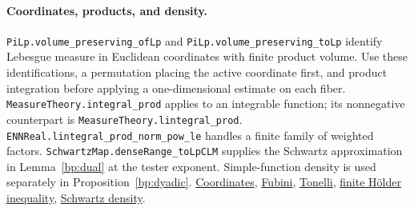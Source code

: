 \documentclass[11pt,letterpaper]{article}
\theoremstyle{definition}
\begin{document}
\paragraph{Coordinates, products, and density.}
\nolinkurl{PiLp.volume_preserving_ofLp} and \nolinkurl{PiLp.volume_preserving_toLp} identify Lebesgue measure in Euclidean coordinates with finite product volume. Use these identifications, a permutation placing the active coordinate first, and product integration before applying a one-dimensional estimate on each fiber. \nolinkurl{MeasureTheory.integral_prod} applies to an integrable function; its nonnegative counterpart is \nolinkurl{MeasureTheory.lintegral_prod}. \nolinkurl{ENNReal.lintegral_prod_norm_pow_le} handles a finite family of weighted factors. \nolinkurl{SchwartzMap.denseRange_toLpCLM} supplies the Schwartz approximation in Lemma~\ref{bp:dual} at the tester exponent. Simple-function density is used separately in Proposition~\ref{bp:dyadic}. \href{https://github.com/leanprover-community/mathlib4/blob/c55e6e786f49471c72fbddbec5415808896aec1e/Mathlib/MeasureTheory/Measure/Haar/InnerProductSpace.lean#L134}{Coordinates}, \href{https://github.com/leanprover-community/mathlib4/blob/c55e6e786f49471c72fbddbec5415808896aec1e/Mathlib/MeasureTheory/Integral/Prod.lean#L440}{Fubini}, \href{https://github.com/leanprover-community/mathlib4/blob/c55e6e786f49471c72fbddbec5415808896aec1e/Mathlib/MeasureTheory/Measure/Prod.lean#L1009}{Tonelli}, \href{https://github.com/leanprover-community/mathlib4/blob/c55e6e786f49471c72fbddbec5415808896aec1e/Mathlib/MeasureTheory/Integral/MeanInequalities.lean#L241}{finite H\"older inequality}, \href{https://github.com/leanprover-community/mathlib4/blob/c55e6e786f49471c72fbddbec5415808896aec1e/Mathlib/Analysis/Distribution/SchwartzSpace/Basic.lean#L1377}{Schwartz density}.
\end{document}
